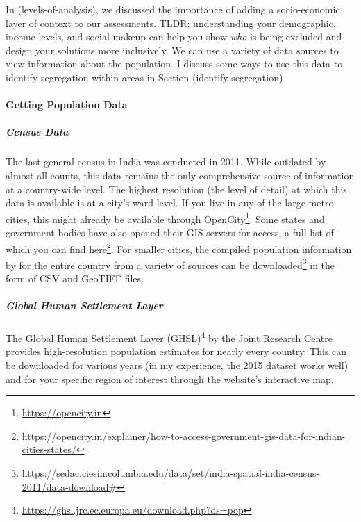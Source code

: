 \documentclass[
]{latex/krantz}
\renewcommand{\href}[2]{#2\footnote{\url{#1}}}
\DeclareRobustCommand{\href}[2]{#2\footnote{\url{#1}}}
\begin{document}
In \textcite{ref}(levels-of-analysis), we discussed the importance of adding a socio-economic layer of context to our assessments. TLDR; understanding your demographic, income levels, and social makeup can help you show \emph{who} is being excluded and design your solutions more inclusively. We can use a variety of data sources to view information about the population. I discuss some ways to use this data to identify segregation within areas in Section \textcite{ref}(identify-segregation)

\hypertarget{getting-population-data}{%
\paragraph{Getting Population Data}\label{getting-population-data}}

\hypertarget{census-data}{%
\subparagraph*{Census Data}\label{census-data}}

The last general census in India was conducted in 2011. While outdated by almost all counts, this data remains the only comprehensive source of information at a country-wide level. The highest resolution (the level of detail) at which this data is available is at a city's ward level. If you live in any of the large metro cities, this might already be available through \href{https://opencity.in}{OpenCity}. Some states and government bodies have also opened their GIS servers for access, a full list of which you can find \href{https://opencity.in/explainer/how-to-access-government-gis-data-for-indian-cities-states/}{here}. For smaller cities, the compiled population information by \autocite{balkSpatialData20112020} for the entire country from a variety of sources can be \href{https://sedac.ciesin.columbia.edu/data/set/india-spatial-india-census-2011/data-download\#}{downloaded} in the form of CSV and GeoTIFF files.

\hypertarget{global-human-settlement-layer}{%
\subparagraph*{Global Human Settlement Layer}\label{global-human-settlement-layer}}

The \href{https://ghsl.jrc.ec.europa.eu/download.php?ds=pop}{Global Human Settlement Layer (GHSL)} by the Joint Research Centre provides high-resolution population estimates for nearly every country. This can be downloaded for various years (in my experience, the 2015 dataset works well) and for your specific region of interest through the website's interactive map.
\end{document}
